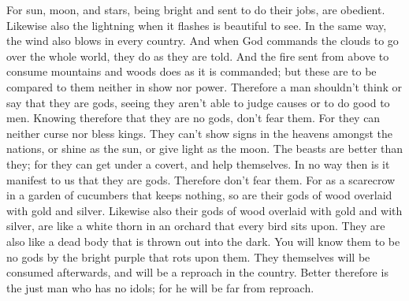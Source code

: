  For sun, moon, and stars, being bright and sent to do
their jobs, are obedient.  Likewise also the lightning when
it flashes is beautiful to see. In the same way, the wind also blows in
every country.  And when God commands the clouds to go over
the whole world, they do as they are told.  And the fire
sent from above to consume mountains and woods does as it is commanded;
but these are to be compared to them neither in show nor power.
 Therefore a man shouldn't think or say that they are gods,
seeing they aren't able to judge causes or to do good to men.
 Knowing therefore that they are no gods, don't fear them.
 For they can neither curse nor bless kings. 
They can't show signs in the heavens amongst the nations, or shine as
the sun, or give light as the moon.  The beasts are better
than they; for they can get under a covert, and help themselves.
 In no way then is it manifest to us that they are gods.
Therefore don't fear them.  For as a scarecrow in a garden
of cucumbers that keeps nothing, so are their gods of wood overlaid with
gold and silver.  Likewise also their gods of wood overlaid
with gold and with silver, are like a white thorn in an orchard that
every bird sits upon. They are also like a dead body that is thrown out
into the dark.  You will know them to be no gods by the
bright purple that rots upon them. They themselves will be consumed
afterwards, and will be a reproach in the country.  Better
therefore is the just man who has no idols; for he will be far from
reproach.
